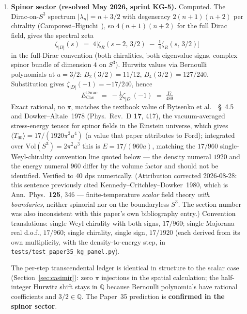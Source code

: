 \documentclass[11pt]{article}
\begin{document}
\begin{enumerate}
\setlength\itemsep{0pt}

\item \textbf{Spinor sector (resolved May 2026, sprint KG-5).}
Computed.  The Dirac-on-$S^3$ spectrum
$|\lambda_n| = n + 3/2$ with degeneracy $2(n+1)(n+2)$ per chirality
(Camporesi--Higuchi~\cite{camporesi_higuchi}), so $4(n+1)(n+2)$ for
the full Dirac field, gives the spectral zeta
\[
\zeta_{|D|}(s) \;=\; 4\bigl[\zeta_R(s{-}2,\, 3/2) \;-\; \tfrac{1}{4}\zeta_R(s,\, 3/2)\bigr]
\]
in the full-Dirac convention (both chiralities, both eigenvalue signs,
complex spinor bundle of dimension $4$ on $S^3$).  Hurwitz values via
Bernoulli polynomials at $a = 3/2$: $B_2(3/2) = 11/12$,
$B_4(3/2) = 127/240$.  Substitution gives $\zeta_{|D|}(-1) = -17/240$,
hence
\begin{equation}
\boxed{E^{\text{Dirac}}_\text{Cas} \;=\; -\tfrac{1}{2}\zeta_{|D|}(-1) \;=\; \tfrac{17}{480}}
\end{equation}
Exact rational, no $\pi$, matches the textbook value of
Bytsenko et al.~\cite{bytsenko}~\S~4.5 and
Dowker--Altaie~1978 (Phys.\ Rev.\ D \textbf{17}, 417), the
vacuum-averaged stress-energy tensor for spinor fields in the Einstein
universe, which gives $\langle T_{00}\rangle = 17/(1920\pi^2 a^4)$
(a value that paper attributes to Ford); integrated over
$\mathrm{Vol}(S^3) = 2\pi^2 a^3$ this is $E = 17/(960a)$, matching the
$17/960$ single-Weyl-chirality convention line quoted below --- the
density numeral $1920$ and the energy numeral $960$ differ by the
volume factor and should not be identified.  Verified to 40 dps numerically.
(Attribution corrected 2026-08-28: this sentence previously cited
Kennedy--Critchley--Dowker~1980, which is Ann.\ Phys.\ \textbf{125}, 346
--- finite-temperature \emph{scalar} field theory \emph{with boundaries},
neither spinorial nor on the boundaryless $S^3$.  The section number was
also inconsistent with this paper's own bibliography entry.)
Convention translations: single Weyl chirality with both signs, $17/960$; single Majorana real d.o.f., $17/960$; single chirality, single sign, $17/1920$ (each derived from its own
multiplicity, with the density-to-energy step, in
\texttt{tests/test\_paper35\_kg\_panel.py}).

The per-step transcendental ledger is identical in structure to the
scalar case (Section~\ref{sec:casimir}): zero $\pi$ injections in
the spatial calculation; the half-integer Hurwitz shift stays in
$\mathbb{Q}$ because Bernoulli polynomials have rational coefficients
and $3/2 \in \mathbb{Q}$.  The Paper~35 prediction is
\textbf{confirmed in the spinor sector}.


\end{enumerate}
\end{document}
